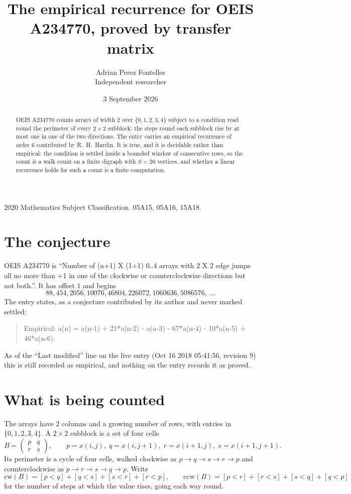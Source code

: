 \documentclass[11pt,a4paper]{article}
\title{The empirical recurrence for OEIS A234770, proved by transfer matrix}
\author{Adrian Perez Fontelles\\ \small Independent researcher}
\date{3 September 2026}
\theoremstyle{plain}
\theoremstyle{definition}
\begin{document}
\maketitle

\begin{abstract}
OEIS A234770 counts arrays of width $2$ over $\{0,1,2,3,4\}$ subject to a condition read round the
perimeter of every $2\times2$ subblock: the steps round each subblock rise by at most one in one of the two directions. The entry carries an empirical recurrence of
order $6$ contributed by R.~H.~Hardin. It is true, and it is decidable rather than
empirical: the condition is settled inside a bounded window of consecutive rows, so the
count is a walk count on a finite digraph with $S=26$ vertices, and whether a linear
recurrence holds for such a count is a finite computation.
\end{abstract}

\noindent\small 2020 Mathematics Subject Classification. 05A15, 05A16, 15A18.\normalsize

\section{The conjecture}

OEIS A234770 is ``Number of (n+1) X (1+1) 0..4 arrays with 2 X 2 edge jumps all no more than +1 in one of the clockwise or counterclockwise directions but not both.''. It has offset $1$ and begins
\[
88, 454, 2056, 10076, 46804, 226072, 1060636, 5086576,\ \dots
\]
The entry states, as a conjecture contributed by its author and never marked settled:
\begin{quote}
Empirical: a(n) = a(n-1) + 21*a(n-2) - a(n-3) - 67*a(n-4) - 10*a(n-5) + 46*a(n-6).
\end{quote}
As of the ``Last modified'' line on the live entry (Oct 16 2018 05:41:56, revision 9) this is still
recorded as empirical, and nothing on the entry records it as proved.

\section{What is being counted}

The arrays have $2$ columns and a growing number of rows, with entries in $\{0,1,2,3,4\}$. A
$2\times2$ subblock is a set of four cells
\[
B=\begin{pmatrix} p & q \\ r & s \end{pmatrix},
\qquad p=x(i,j),\; q=x(i,j+1),\; r=x(i+1,j),\; s=x(i+1,j+1).
\]
Its perimeter is a cycle of four cells, walked clockwise as $p\to q\to s\to r\to p$ and
counterclockwise as $p\to r\to s\to q\to p$. Write
\[
\mathrm{cw}(B)=[p<q]+[q<s]+[s<r]+[r<p],\qquad
\mathrm{ccw}(B)=[p<r]+[r<s]+[s<q]+[q<p]
\]
for the number of steps at which the value rises, going each way round.
\end{document}
